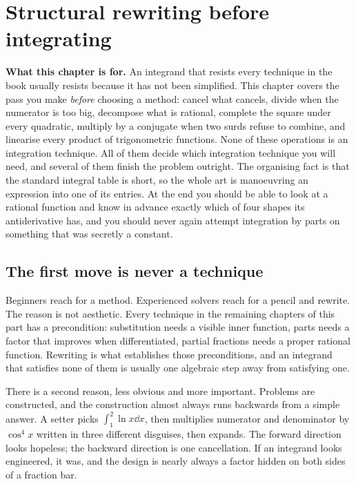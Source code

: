 \chapter{Structural rewriting before integrating}

\begin{orient}
\textbf{What this chapter is for.} An integrand that resists every technique in the book usually resists because it has not been simplified. This chapter covers the pass you make \emph{before} choosing a method: cancel what cancels, divide when the numerator is too big, decompose what is rational, complete the square under every quadratic, multiply by a conjugate when two surds refuse to combine, and linearise every product of trigonometric functions. None of these operations is an integration technique. All of them decide which integration technique you will need, and several of them finish the problem outright. The organising fact is that the standard integral table is short, so the whole art is manoeuvring an expression into one of its entries. At the end you should be able to look at a rational function and know in advance exactly which of four shapes its antiderivative has, and you should never again attempt integration by parts on something that was secretly a constant.
\end{orient}

\section{The first move is never a technique}

Beginners reach for a method. Experienced solvers reach for a pencil and rewrite. The reason is not aesthetic. Every technique in the remaining chapters of this part has a precondition: substitution needs a visible inner function, parts needs a factor that improves when differentiated, partial fractions needs a proper rational function. Rewriting is what establishes those preconditions, and an integrand that satisfies none of them is usually one algebraic step away from satisfying one.

There is a second reason, less obvious and more important. Problems are constructed, and the construction almost always runs backwards from a simple answer. A setter picks $\int_1^2\ln x\dd x$, then multiplies numerator and denominator by $\cos^4x$ written in three different disguises, then expands. The forward direction looks hopeless; the backward direction is one cancellation. If an integrand looks engineered, it was, and the design is nearly always a factor hidden on both sides of a fraction bar.

